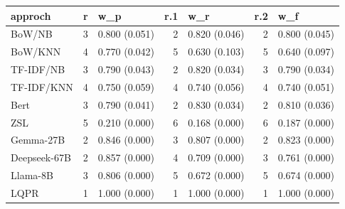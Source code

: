 \begin{tabular}{lrlrlrl}
\hline
 approch      &   r & w\_p           &   r.1 & w\_r           &   r.2 & w\_f           \\
\hline
 BoW/NB       &   3 & 0.800 (0.051) &     2 & 0.820 (0.046) &     2 & 0.800 (0.045) \\
 BoW/KNN      &   4 & 0.770 (0.042) &     5 & 0.630 (0.103) &     5 & 0.640 (0.097) \\
 TF-IDF/NB    &   3 & 0.790 (0.043) &     2 & 0.820 (0.034) &     3 & 0.790 (0.034) \\
 TF-IDF/KNN   &   4 & 0.750 (0.059) &     4 & 0.740 (0.056) &     4 & 0.740 (0.051) \\
 Bert         &   3 & 0.790 (0.041) &     2 & 0.830 (0.034) &     2 & 0.810 (0.036) \\
 ZSL          &   5 & 0.210 (0.000) &     6 & 0.168 (0.000) &     6 & 0.187 (0.000) \\
 Gemma-27B    &   2 & 0.846 (0.000) &     3 & 0.807 (0.000) &     2 & 0.823 (0.000) \\
 Deepseek-67B &   2 & 0.857 (0.000) &     4 & 0.709 (0.000) &     3 & 0.761 (0.000) \\
 Llama-8B     &   3 & 0.806 (0.000) &     5 & 0.672 (0.000) &     5 & 0.674 (0.000) \\
 LQPR         &   1 & 1.000 (0.000) &     1 & 1.000 (0.000) &     1 & 1.000 (0.000) \\
\hline
\end{tabular}